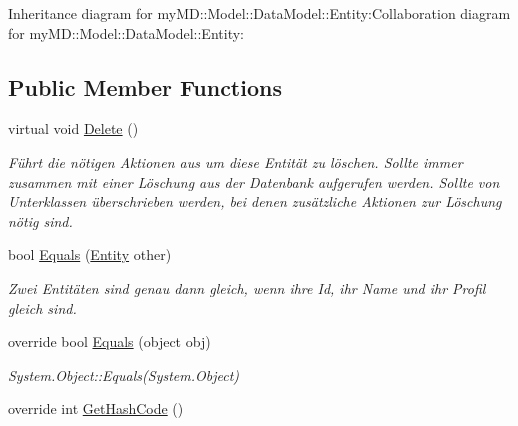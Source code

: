 Inheritance diagram for my\-MD::Model::Data\-Model::Entity:Collaboration diagram for my\-MD::Model::Data\-Model::Entity:\subsection*{Public Member Functions}
\begin{CompactItemize}
\item 
\hypertarget{classmy_m_d_1_1_model_1_1_data_model_1_1_entity_51a833214dab53bfafb630573fc0fe77}{
virtual void \hyperlink{classmy_m_d_1_1_model_1_1_data_model_1_1_entity_51a833214dab53bfafb630573fc0fe77}{Delete} ()}
\label{d7/d0a/classmy_m_d_1_1_model_1_1_data_model_1_1_entity_51a833214dab53bfafb630573fc0fe77}

\begin{CompactList}\small\item\em F\"{u}hrt die n\"{o}tigen Aktionen aus um diese Entit\"{a}t zu l\"{o}schen. Sollte immer zusammen mit einer L\"{o}schung aus der Datenbank aufgerufen werden. Sollte von Unterklassen \"{u}berschrieben werden, bei denen zus\"{a}tzliche Aktionen zur L\"{o}schung n\"{o}tig sind. \item\end{CompactList}\item 
bool \hyperlink{classmy_m_d_1_1_model_1_1_data_model_1_1_entity_a75e8a3dc731ab0e2966da6f482119fc}{Equals} (\hyperlink{classmy_m_d_1_1_model_1_1_data_model_1_1_entity}{Entity} other)
\begin{CompactList}\small\item\em Zwei Entit\"{a}ten sind genau dann gleich, wenn ihre Id, ihr Name und ihr Profil gleich sind. \item\end{CompactList}\item 
\hypertarget{classmy_m_d_1_1_model_1_1_data_model_1_1_entity_b93f11cf5ba054f230a537cff58bd1c9}{
override bool \hyperlink{classmy_m_d_1_1_model_1_1_data_model_1_1_entity_b93f11cf5ba054f230a537cff58bd1c9}{Equals} (object obj)}
\label{d7/d0a/classmy_m_d_1_1_model_1_1_data_model_1_1_entity_b93f11cf5ba054f230a537cff58bd1c9}

\begin{CompactList}\small\item\em System.Object::Equals(System.Object) \item\end{CompactList}\item 
\hypertarget{classmy_m_d_1_1_model_1_1_data_model_1_1_entity_871aff832c00675bb79db4294f382e58}{
override int \hyperlink{classmy_m_d_1_1_model_1_1_data_model_1_1_entity_871aff832c00675bb79db4294f382e58}{Get\-Hash\-Code} ()}
\label{d7/d0a/classmy_m_d_1_1_model_1_1_data_model_1_1_entity_871aff832c00675bb79db4294f382e58}


\end{CompactItemize}

